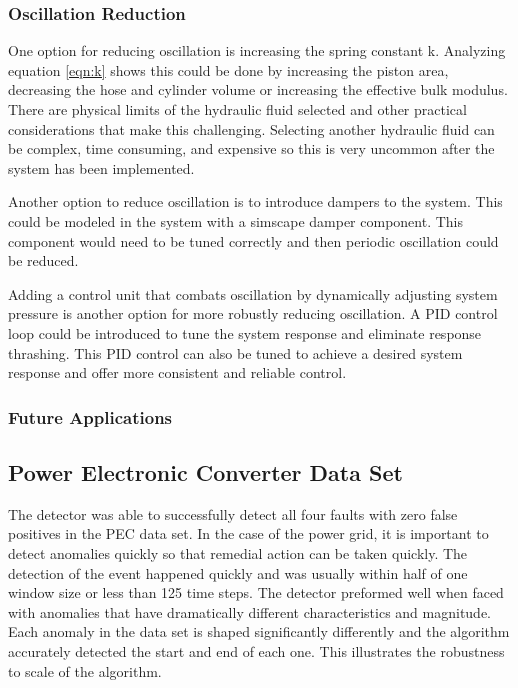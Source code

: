 \subsubsection{Oscillation Reduction}

One option for reducing oscillation is increasing the spring constant k. Analyzing equation \ref{eqn:k} shows this could be done by increasing the piston area, decreasing the hose and cylinder volume or increasing the effective bulk modulus. There are physical limits of the hydraulic fluid selected and other practical considerations that make this challenging. Selecting another hydraulic fluid can be complex, time consuming, and expensive so this is very uncommon after the system has been implemented. 

Another option to reduce oscillation is to introduce dampers to the system. This could be modeled in the system with a simscape damper component. This component would need to be tuned correctly and then periodic oscillation could be reduced.

Adding a control unit that combats oscillation by dynamically adjusting system pressure is another option for more robustly reducing oscillation. A PID control loop could be introduced to tune the system response and eliminate response thrashing. This PID control can also be tuned to achieve a desired system response and offer more consistent and reliable control.

\subsubsection{Future Applications}

\subsection{Power Electronic Converter Data Set}

The detector was able to successfully detect all four faults with zero false positives in the PEC data set. In the case of the power grid, it is important to detect anomalies quickly so that remedial action can be taken quickly.  The detection of the event happened quickly and was usually within half of one window size or less than 125 time steps. The detector preformed well when faced with anomalies that have dramatically different characteristics and magnitude. Each anomaly in the data set is shaped significantly differently and the algorithm accurately detected the start and end of each one. This illustrates the robustness to scale of the algorithm.

